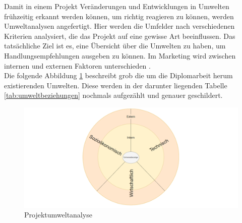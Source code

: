 Damit in einem Projekt Veränderungen und Entwicklungen in Umwelten frühzeitig erkannt werden können, um richtig reagieren zu können, werden Umweltanalysen angefertigt. Hier werden die Umfelder nach verschiedenen Kriterien analysiert, die das Projekt auf eine gewisse Art beeinflussen. Das tatsächliche Ziel ist es, eine Übersicht über die Umwelten zu haben, um Handlungsempfehlungen ausgeben zu können. Im Marketing wird zwischen internen und externen Faktoren unterschieden \cite[vgl.][]{Wikipedia:2023, Redaktion:2024}. \\
Die folgende Abbildung \ref{fig:umweltanalyse} beschreibt grob die um die Diplomarbeit herum existierenden Umwelten. Diese werden in der darunter liegenden Tabelle \ref{tab:umweltbeziehungen} nochmals aufgezählt und genauer geschildert.

\begin{figure}[H]
	\centering
	\includegraphics[width=15cm]{Bilder/Umweltanalyse}
	\caption{Projektumweltanalyse}
	\label{fig:umweltanalyse}
\end{figure}

